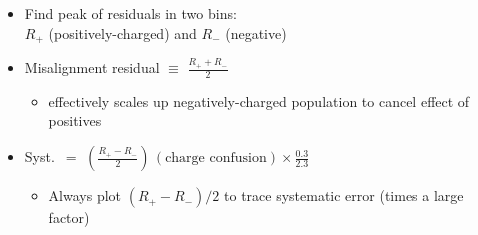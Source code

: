 \documentclass[compress]{beamer}
\begin{document}
\begin{frame}
\begin{columns}
\vspace{0.3 cm}
\begin{itemize}\setlength{\itemsep}{0.1 cm}
\item Find peak of residuals in two bins: \\ $R_+$ (positively-charged) and $R_-$ \mbox{(negative)\hspace{-1 cm}}
\item Misalignment residual $\equiv$ $\displaystyle \frac{R_+ + R_-}{2}$
\begin{itemize}
\item effectively scales up negatively-charged population to cancel effect of positives
\end{itemize}
\item Syst.\ $=$ \mbox{$\displaystyle \left(\frac{R_+ - R_-}{2}\right) \, (\mbox{charge confusion}) \times \frac{0.3}{2.3}$\hspace{-2 cm}}
\begin{itemize}
\item Always plot $(R_+ - R_-)/2$ to trace systematic error (times a large factor)
\end{itemize}
\end{itemize}

\end{columns}
\end{frame}
\end{document}
